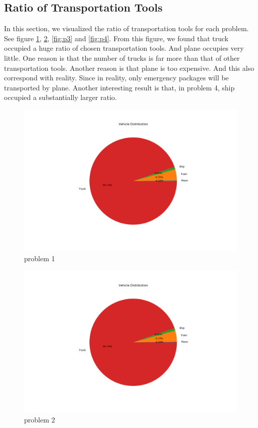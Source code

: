 \documentclass[11pt, a4paper]{article} %
\begin{document}
\subsection{Ratio of Transportation Tools}
	In this section, we visualized the ratio of transportation tools for each problem. See figure \ref{fig:p1}, \ref{fig:p2}, \ref{fig:p3} and \ref{fig:p4}. From this figure, we found that truck occupied a huge ratio of chosen transportation tools. And plane occupies very little. One reason is that the number of trucks is far more than that of other transportation tools. Another reason is that plane is too expensive. And this also correspond with reality. Since in reality, only emergency packages will be transported by plane. Another interesting result is that, in problem 4, ship occupied a substantially larger ratio.
	\begin{figure}
		\centering
		\includegraphics[width=0.8\linewidth]{figure/vehicle1.png}
		\caption{problem 1}
		\label{fig:p1}
	\end{figure}
	\begin{figure}
		\centering
		\includegraphics[width=0.8\linewidth]{figure/vehicle2.png}
		\caption{problem 2}
		\label{fig:p2}
	\end{figure}
\end{document}
